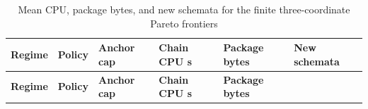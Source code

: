\documentclass[pdflatex,sn-basic,Numbered]{sn-jnl}
\begin{document}
\begin{longtable}[]{@{}
  >{\raggedright\arraybackslash}p{}
  >{\raggedright\arraybackslash}p{}
  >{\raggedleft\arraybackslash}p{}
  >{\raggedleft\arraybackslash}p{}
  >{\raggedleft\arraybackslash}p{}
  >{\raggedleft\arraybackslash}p{}@{}}
\caption{Mean CPU, package bytes, and new schemata for the finite three-coordinate Pareto frontiers}\label{tab:31}\tabularnewline
\toprule\noalign{}
\begin{minipage}[b]{\linewidth}\raggedright
\textbf{Regime}
\end{minipage} & \begin{minipage}[b]{\linewidth}\raggedright
\textbf{Policy}
\end{minipage} & \begin{minipage}[b]{\linewidth}\raggedleft
\textbf{Anchor cap}
\end{minipage} & \begin{minipage}[b]{\linewidth}\raggedleft
\textbf{Chain CPU s}
\end{minipage} & \begin{minipage}[b]{\linewidth}\raggedleft
\textbf{Package bytes}
\end{minipage} & \begin{minipage}[b]{\linewidth}\raggedleft
\textbf{New schemata}
\end{minipage} \\
\midrule\noalign{}
\endfirsthead
\toprule\noalign{}
\begin{minipage}[b]{\linewidth}\raggedright
\textbf{Regime}
\end{minipage} & \begin{minipage}[b]{\linewidth}\raggedright
\textbf{Policy}
\end{minipage} & \begin{minipage}[b]{\linewidth}\raggedleft
\textbf{Anchor cap}
\end{minipage} & \begin{minipage}[b]{\linewidth}\raggedleft
\textbf{Chain CPU s}
\end{minipage} & \begin{minipage}[b]{\linewidth}\raggedleft
\textbf{Package bytes}
\end{minipage} & \begin{minipage}[b]{\linewidth}\raggedleft

\end{minipage}
\end{longtable}
\end{document}
